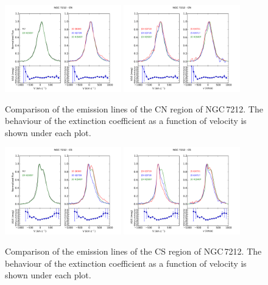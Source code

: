 \documentclass[../main.tex]{subfiles}
\begin{document}
\begin{figure}
\centering
\includegraphics[width=0.45\textwidth]{images/paper1/NGC7212_cn_l1.pdf} \quad
\includegraphics[width=0.45\textwidth]{images/paper1/NGC7212_cn_l2.pdf}\\
\caption[]{Comparison of the emission lines of the CN region of NGC\,7212. The behaviour of the extinction coefficient as a function of velocity is shown under each plot.}
\label{fig:cnl1_N}
\end{figure}

\begin{figure}
\centering
\includegraphics[width=0.45\textwidth]{images/paper1/NGC7212_cs_l1.pdf} \quad
\includegraphics[width=0.45\textwidth]{images/paper1/NGC7212_cs_l2.pdf}\\
\caption[]{Comparison of the emission lines of the CS region of NGC\,7212. The behaviour of the extinction coefficient as a function of velocity is shown under each plot.}
\label{fig:csl1_N}
\end{figure}
\end{document}
